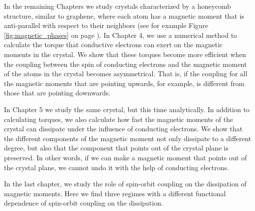 In the remaining Chapters we study crystals characterized by a honeycomb structure, similar to graphene, where each atom has a magnetic moment that is anti-parallel with respect to their neighbors (see for example Figure \ref{fig:magnetic_phases} on page \pageref{fig:magnetic_phases}). In Chapter 4, we use a numerical method to calculate the torque that conductive electrons can exert on the magnetic moments in the crystal. We show that these torques become more efficient when the coupling between the spin of conducting electrons and the magnetic moment of the atoms in the crystal becomes asymmetrical. That is, if the coupling for all the magnetic moments that are pointing upwards, for example, is different from those that are pointing downwards.

In Chapter 5 we study the same crystal, but this time analytically. In addition to calculating torques, we also calculate how fast the magnetic moments of the crystal can dissipate under the influence of conducting electrons. We show that the different components of the magnetic moment not only dissipate to a different degree, but also that the component that points out of the crystal plane is preserved. In other words, if we can make a magnetic moment that points out of the crystal plane, we cannot undo it with the help of conducting electrons.

In the last chapter, we study the role of spin-orbit coupling on the dissipation of magnetic moments. Here we find three regimes with a different functional dependence of spin-orbit coupling on the dissipation. 